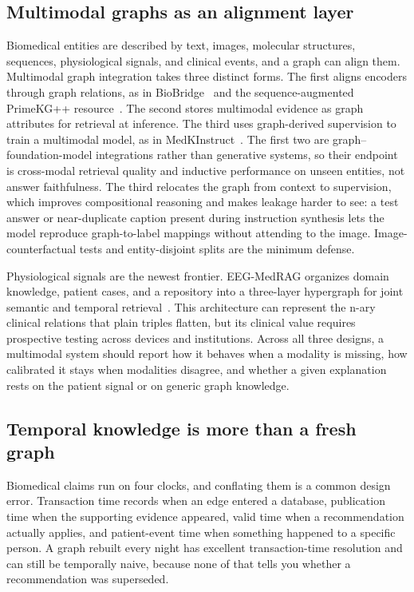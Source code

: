 \subsection{Multimodal graphs as an alignment layer}

Biomedical entities are described by text, images, molecular structures, sequences, physiological signals, and clinical events, and a graph can align them. Multimodal graph integration takes three distinct forms. The first aligns encoders through graph relations, as in BioBridge~\cite{wang2024biobridge} and the sequence-augmented PrimeKG++ resource~\cite{dang2025biomedkg}. The second stores multimodal evidence as graph attributes for retrieval at inference. The third uses graph-derived supervision to train a multimodal model, as in MedKInstruct~\cite{wu2026medkinstruct}. The first two are graph--foundation-model integrations rather than generative systems, so their endpoint is cross-modal retrieval quality and inductive performance on unseen entities, not answer faithfulness. The third relocates the graph from context to supervision, which improves compositional reasoning and makes leakage harder to see: a test answer or near-duplicate caption present during instruction synthesis lets the model reproduce graph-to-label mappings without attending to the image. Image-counterfactual tests and entity-disjoint splits are the minimum defense.

Physiological signals are the newest frontier. EEG-MedRAG organizes domain knowledge, patient cases, and a repository into a three-layer hypergraph for joint semantic and temporal retrieval~\cite{wang2025eegmedrag}. This architecture can represent the n-ary clinical relations that plain triples flatten, but its clinical value requires prospective testing across devices and institutions. Across all three designs, a multimodal system should report how it behaves when a modality is missing, how calibrated it stays when modalities disagree, and whether a given explanation rests on the patient signal or on generic graph knowledge.

\subsection{Temporal knowledge is more than a fresh graph}

Biomedical claims run on four clocks, and conflating them is a common design error. Transaction time records when an edge entered a database, publication time when the supporting evidence appeared, valid time when a recommendation actually applies, and patient-event time when something happened to a specific person. A graph rebuilt every night has excellent transaction-time resolution and can still be temporally naive, because none of that tells you whether a recommendation was superseded.

